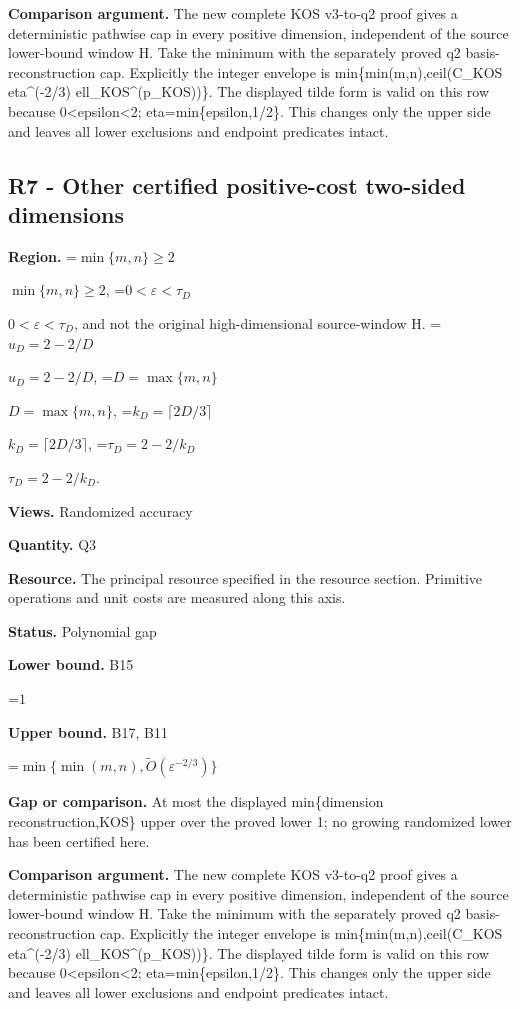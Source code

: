 \documentclass[10pt,a4paper]{article}
\newcommand{\AtlasMath}[1]{\par\begingroup\centering\setbox0=\hbox{$\displaystyle #1$}\ifdim\wd0>1.4\linewidth\typeout{ATLAS WIDE FORMULA: \the\wd0}\fi\ifdim\wd0>\linewidth\resizebox{\linewidth}{!}{\box0}\else\box0\fi\par\endgroup}
\newcommand{\AtlasInlineMath}[1]{\begingroup\setbox0=\hbox{$#1$}\ifdim\wd0>.4\linewidth\endgroup\AtlasMath{#1}\else\endgroup$#1$\fi}
\begin{document}
\textbf{Comparison argument.} The new complete KOS v3-to-q2 proof gives a deterministic pathwise cap in every positive dimension, independent of the source lower-bound window H. Take the minimum with the separately proved q2 basis-reconstruction cap. Explicitly the integer envelope is min\{min(m,n),ceil(C\_KOS eta\textasciicircum{}(-2/3) ell\_KOS\textasciicircum{}(p\_KOS))\}. The displayed tilde form is valid on this row because 0<epsilon<2; eta=min\{epsilon,1/2\}. This changes only the upper side and leaves all lower exclusions and endpoint predicates intact.



\subsection{R7 - Other certified positive-cost two-sided dimensions}


\textbf{Region.} \AtlasInlineMath{\min\{m,n\}\ge2}, \AtlasInlineMath{0<\varepsilon<\tau_D}, and not the original high-dimensional source-window H. \AtlasInlineMath{u_D=2-2/D}, \AtlasInlineMath{D=\max\{m,n\}}, \AtlasInlineMath{k_D=\lceil2D/3\rceil}, \AtlasInlineMath{\tau_D=2-2/k_D}.



\textbf{Views.} Randomized accuracy



\textbf{Quantity.} Q3



\textbf{Resource.} The principal resource specified in the resource section. Primitive operations and unit costs are measured along this axis.



\textbf{Status.} Polynomial gap



\textbf{Lower bound.} B15



\AtlasMath{1}


\textbf{Upper bound.} B17, B11



\AtlasMath{\min\{\min(m,n),\widetilde O(\varepsilon^{-2/3})\}}


\textbf{Gap or comparison.} At most the displayed min\{dimension reconstruction,KOS\} upper over the proved lower 1; no growing randomized lower has been certified here.



\textbf{Comparison argument.} The new complete KOS v3-to-q2 proof gives a deterministic pathwise cap in every positive dimension, independent of the source lower-bound window H. Take the minimum with the separately proved q2 basis-reconstruction cap. Explicitly the integer envelope is min\{min(m,n),ceil(C\_KOS eta\textasciicircum{}(-2/3) ell\_KOS\textasciicircum{}(p\_KOS))\}. The displayed tilde form is valid on this row because 0<epsilon<2; eta=min\{epsilon,1/2\}. This changes only the upper side and leaves all lower exclusions and endpoint predicates intact.
\end{document}
